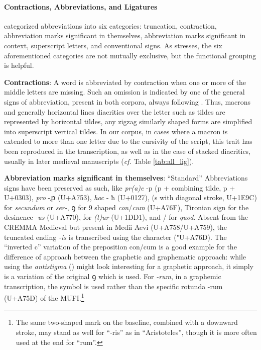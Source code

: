 \documentclass{article}
\newcommand{\juni}[1]{\textsf{\junicodeFont #1}}%
\begin{document}
\paragraph{Contractions, Abbreviations, and Ligatures}

\cite{cappelli1899dizionario} categorized abbreviations into six categories: truncation, contraction,  abbreviation marks significant in themselves, abbreviation marks significant in context, superscript letters, and conventional signs. As \cite{plutaabbreviations2020} stresses, the six aforementioned categories are not mutually exclusive, but the functional grouping is helpful.  

\textbf{Contractions}: A word is abbreviated by contraction when one or more of the middle letters are missing. Such an omission is indicated by one of the general signs of abbreviation, present in both corpora, always following \cite{pinche:hal-03697382}. Thus, macrons and generally horizontal lines diacritics over the letter such as tildes are represented by horizontal tildes, any zigzag similarly shaped forms are simplified into superscript vertical tildes. In our corpus, in cases where a macron is extended to more than one letter due to the cursivity of the script, this trait has been reproduced in the transcription, as well as in the case of stacked diacritics, usually in later medieval manuscripts (\textit{cf.} Table \ref{tab:all_lig}).

\textbf{Abbreviation marks significant in themselves}: \enquote{Standard} Abbreviations signs have been preserved as such, like \textit{pr(a)e} -\juni{p} (p + combining tilde, p + U+0303),  \textit{pro} -\juni{ꝓ} (U+A753), \textit{hoc} - \juni{ħ} (U+0127), \juni{} (s with diagonal stroke, U+1E9C) for \textit{secundum} or \textit{ser-}, \juni{ꝯ} for 9 shaped \textit{con}/\textit{cum} (U+A76F), Tironian sign \juni{} for the desinence \textit{-us} (U+A770), \juni{} for \textit{(t)ur} (U+1DD1),  and \juni{}/ \juni{} for \textit{quod}. Absent from the CREMMA Medieval but present in Medii Aevi (U+A758/U+A759), the truncated ending \textit{-is} is transcribed using the character \juni{} ("U+A76D). 
The \enquote{inverted c} variation of the preposition con/cum is a good example for the difference of approach between the graphetic and graphematic approach: while using the \textit{antistigma} (\juni{}) might look interesting for a graphetic approach, it simply is a variation of the original \juni{ꝯ} which is used. For \textit{-rum}, in a graphemic transcription, the symbol \juni{} is used rather than the specific rotunda -rum \juni{} (U+A75D) of the MUFI.\footnote{The same two-shaped mark on the baseline, combined with a downward stroke, may stand as well for ``-ris'' as in ``Aristoteles'', though it is more often used at the end for ``rum''.}
\end{document}
